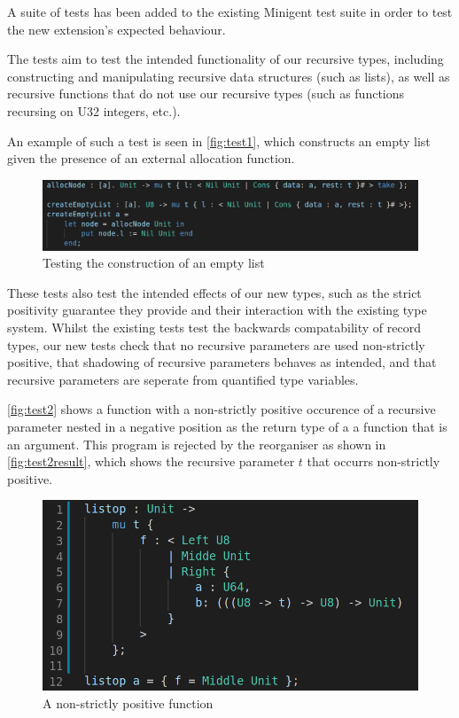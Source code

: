 
A suite of tests has been added to the existing Minigent test suite in order to test the new extension's 
expected behaviour.

The tests aim to test the intended functionality of our recursive types, including constructing and manipulating
recursive data structures (such as lists), as well as recursive functions that do not use our recursive types 
(such as functions recursing on U32 integers, etc.).

An example of such a test is seen in \autoref{fig:test1}, which constructs an empty list given the presence
of an external allocation function.

\begin{figure}
    \centering
    \includegraphics[width=\linewidth]{content/test1.png}
    \caption{Testing the construction of an empty list }
    \label{fig:test1}
\end{figure}

These tests also test the intended effects of our new types, such as the strict positivity guarantee they provide
and their interaction with the existing type system. Whilst the existing tests test the backwards compatability of
record types, our new tests check that no recursive parameters are used non-strictly positive, that shadowing of recursive
parameters behaves as intended, and that recursive parameters are seperate from quantified type variables.

\autoref{fig:test2} shows a function with a non-strictly positive occurence of a recursive parameter nested in 
a negative position as the return type of a a function that is an argument. This program is rejected by the reorganiser
as shown in \autoref{fig:test2result}, which shows the recursive parameter $t$ that occurrs non-strictly positive.

\begin{figure}
    \centering
    \includegraphics[width=0.8\linewidth]{content/test2.png}
    \caption{A non-strictly positive function}
    \label{fig:test2}
\end{figure}

